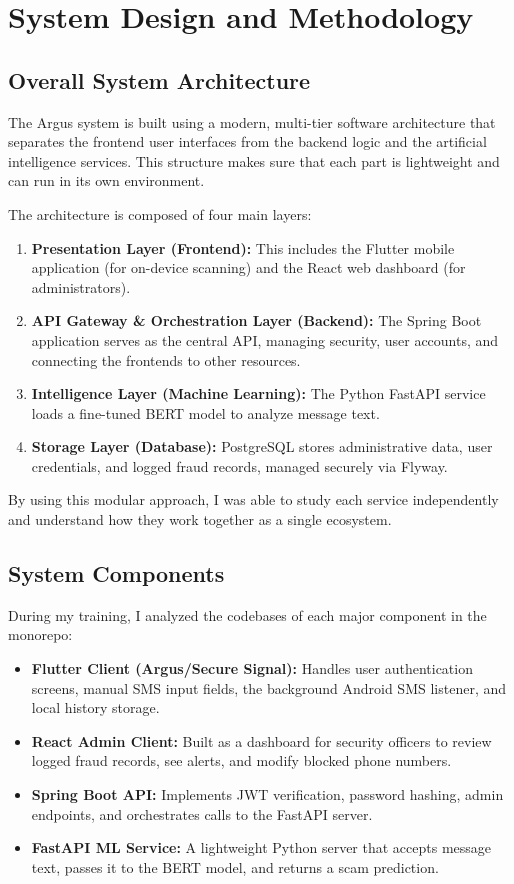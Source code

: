 \chapter{System Design and Methodology}
\label{ch:design}

\section{Overall System Architecture}
The Argus system is built using a modern, multi-tier software architecture that separates the frontend user interfaces from the backend logic and the artificial intelligence services. This structure makes sure that each part is lightweight and can run in its own environment.

The architecture is composed of four main layers:
\begin{enumerate}
  \item \textbf{Presentation Layer (Frontend):} This includes the Flutter mobile application (for on-device scanning) and the React web dashboard (for administrators).
  \item \textbf{API Gateway \& Orchestration Layer (Backend):} The Spring Boot application serves as the central API, managing security, user accounts, and connecting the frontends to other resources.
  \item \textbf{Intelligence Layer (Machine Learning):} The Python FastAPI service loads a fine-tuned BERT model to analyze message text.
  \item \textbf{Storage Layer (Database):} PostgreSQL stores administrative data, user credentials, and logged fraud records, managed securely via Flyway.
\end{enumerate}

By using this modular approach, I was able to study each service independently and understand how they work together as a single ecosystem.

\section{System Components}
During my training, I analyzed the codebases of each major component in the monorepo:
\begin{itemize}
  \item \textbf{Flutter Client (Argus/Secure Signal):} Handles user authentication screens, manual SMS input fields, the background Android SMS listener, and local history storage.
  \item \textbf{React Admin Client:} Built as a dashboard for security officers to review logged fraud records, see alerts, and modify blocked phone numbers.
  \item \textbf{Spring Boot API:} Implements JWT verification, password hashing, admin endpoints, and orchestrates calls to the FastAPI server.
  \item \textbf{FastAPI ML Service:} A lightweight Python server that accepts message text, passes it to the BERT model, and returns a scam prediction.
\end{itemize}

